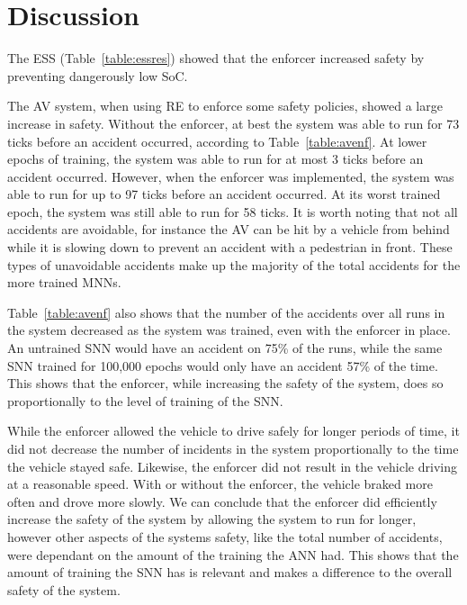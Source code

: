 \section{Discussion}
\label{sec:discussion}

The \ac{ESS} (Table~\ref{table:essres}) showed that the enforcer increased safety by preventing dangerously low \acf{SoC}.

The \ac{AV} system, when using \ac{RE} to enforce some safety policies, showed a large increase in safety.
Without the enforcer, at best the system was able to run for 73 ticks before an accident occurred, according to Table~\ref{table:avenf}.
At lower epochs of training, the system was able to run for at most 3 ticks before an accident occurred.
However, when the enforcer was implemented, the system was able to run for up to 97 ticks before an accident occurred.
At its worst trained epoch, the system was still able to run for 58 ticks.
It is worth noting that not all accidents are avoidable, for instance the \ac{AV} can be hit by a vehicle from behind while it is slowing down to prevent an accident with a pedestrian in front.
These types of unavoidable accidents make up the majority of the total accidents for the more trained \acp{MNN}.

Table~\ref{table:avenf} also shows that the number of the accidents over all runs in the system decreased as the system was trained, even with the enforcer in place.
An untrained \ac{SNN} would have an accident on 75\% of the runs, while the same \ac{SNN} trained for 100,000 epochs would only have an accident 57\% of the time.
This shows that the enforcer, while increasing the safety of the system, does so proportionally to the level of training of the \ac{SNN}.

While the enforcer allowed the vehicle to drive safely for longer periods of time, it did not decrease the number of incidents in the system proportionally to the time the vehicle stayed safe.
Likewise, the enforcer did not result in the vehicle driving at a reasonable speed.
With or without the enforcer, the vehicle braked more often and drove more slowly.
We can conclude that the enforcer did efficiently increase the safety of the system by allowing the system to run for longer, however other aspects of the systems safety, like the total number of accidents, were dependant on the amount of the training the \ac{ANN} had.
This shows that the amount of training the \ac{SNN} has is relevant and makes a difference to the overall safety of the system.

